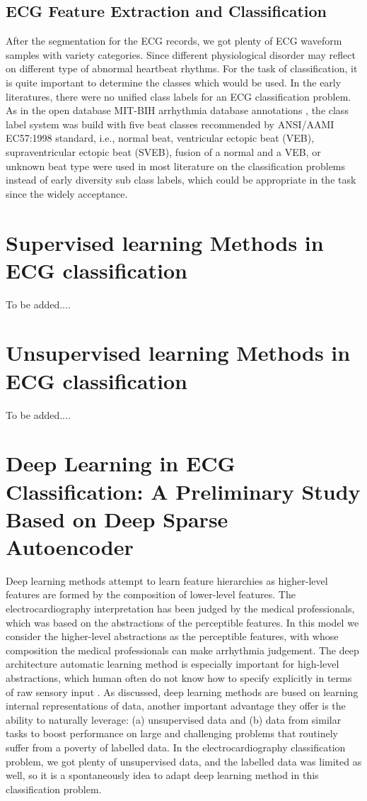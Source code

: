 \documentclass{bmcart}
\begin{document}
\subsection*{ECG Feature Extraction and Classification}
After the segmentation for the ECG records, we got plenty of ECG waveform samples with variety categories. Since different physiological disorder may reflect on different type of abnormal heartbeat rhythms. For the task of classification, it is quite important to determine the classes which would be used. In the early literatures, there were no unified class labels for an ECG classification problem. As in the open database MIT-BIH arrhythmia database annotations \cite{mark1982annotated, moody1990bih}, the class label system was build with five beat classes recommended by ANSI/AAMI EC57:1998 standard, i.e., normal beat, ventricular ectopic beat (VEB), supraventricular ectopic beat (SVEB), fusion of a normal and a VEB, or unknown beat type were used in most literature on the classification problems instead of early diversity sub class labels, which could be appropriate in the task since the widely acceptance. 


\section*{Supervised learning Methods in ECG classification}

To be added....

\section*{Unsupervised learning Methods in ECG classification}

To be added....


\section*{Deep Learning in ECG Classification: A Preliminary Study Based on Deep Sparse Autoencoder}
Deep learning methods attempt to learn feature hierarchies as higher-level features are formed by the composition of lower-level features. The electrocardiography interpretation has been judged by the medical professionals, which was based on the abstractions of the perceptible features. In this model we consider the higher-level abstractions as the perceptible features, with whose composition the medical professionals can make arrhythmia judgement. The deep architecture automatic learning method is especially important for high-level abstractions, which human often do not know how to specify explicitly in terms of raw sensory input \cite{erhan}. As \cite{collobert} discussed, deep learning methods are bused on learning internal representations of data, another important advantage they offer is the ability to naturally leverage: (a) unsupervised data and (b) data from similar tasks to boost performance on large and challenging problems that routinely suffer from a poverty of labelled data. In the electrocardiography classification problem, we got plenty of unsupervised data, and the labelled data was limited as well, so it is a spontaneously idea to adapt deep learning method in this classification problem. 
\end{document}
